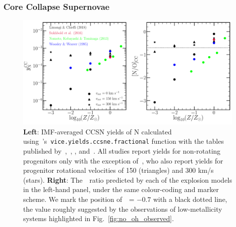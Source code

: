 \documentclass[ms.tex]{subfiles}
\begin{document}
\subsubsection{Core Collapse Supernovae} 
\label{sec:methods:yields:ccsn} 

\begin{figure} 
\centering 
\includegraphics[scale = 0.5]{n_cc_yields.pdf} 
\caption{
\textbf{Left}: IMF-averaged CCSN yields of N calculated 
using~\vice's~\texttt{vice.yields.ccsne.fractional} function with the tables 
published by~\citet[][blue]{Woosley1995},~\citet*[][green]{Nomoto2013}, 
\citet[][red]{Sukhbold2016}, and~\citet[][black]{Limongi2018}. 
All studies report yields for non-rotating progenitors only with the exception 
of~\citet{Limongi2018}, who also report yields for progenitor rotational 
velocities of 150 (triangles) and 300 km/s (stars). 
\textbf{Right}: The~\no~ratio predicted by each of the explosion models in 
the left-hand panel, under the same colour-coding and marker scheme. 
We mark the position of~\no~= $-0.7$ with a black dotted line, the value 
roughly suggested by the observations of low-metallicity systems highlighted in 
Fig.~\ref{fig:no_oh_observed}. 
}
\label{fig:n_cc_yields} 
\end{figure} 

\newcommand{\subcc}{\ensuremath{_\text{cc}}} 
\end{document}
